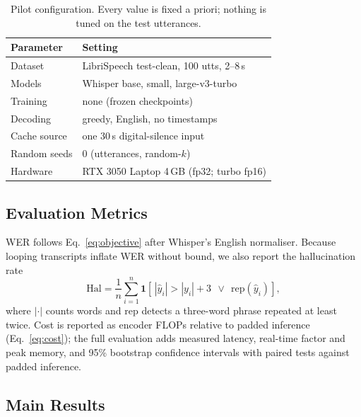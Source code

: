 \begin{table}[!htbp]
\centering
\small
\setlength{\tabcolsep}{8pt}
\caption{Pilot configuration. Every value is fixed a priori; nothing is tuned on the test utterances.}
\label{tab:setup}
\begin{tabular}{l l}
\toprule
\textbf{Parameter} & \textbf{Setting} \\
\midrule
Dataset & LibriSpeech test-clean, 100 utts, 2--8\,s \\
Models & Whisper base, small, large-v3-turbo \\
Training & none (frozen checkpoints) \\
Decoding & greedy, English, no timestamps \\
Cache source & one 30\,s digital-silence input \\
Random seeds & 0 (utterances, random-$k$) \\
Hardware & RTX 3050 Laptop 4\,GB (fp32; turbo fp16) \\
\bottomrule
\end{tabular}
\end{table}

\subsection{Evaluation Metrics}
\label{sec:metrics}

WER follows Eq.~\eqref{eq:objective} after Whisper's English normaliser. Because looping transcripts inflate WER without bound, we also report the hallucination rate
\begin{equation}
    \mathrm{Hal}
    = \frac{1}{n}\sum_{i=1}^{n}
      \mathbf{1}\!\left[\,|\widehat{y}_i|>|y_i|+3\ \ \lor\ \ \mathrm{rep}(\widehat{y}_i)\right],
    \label{eq:accuracy}
\end{equation}
where $|\cdot|$ counts words and $\mathrm{rep}$ detects a three-word phrase repeated at least twice. Cost is reported as encoder FLOPs relative to padded inference (Eq.~\eqref{eq:cost}); the full evaluation adds measured latency, real-time factor and peak memory, and 95\% bootstrap confidence intervals with paired tests against padded inference.

\subsection{Main Results}
\label{sec:results}

